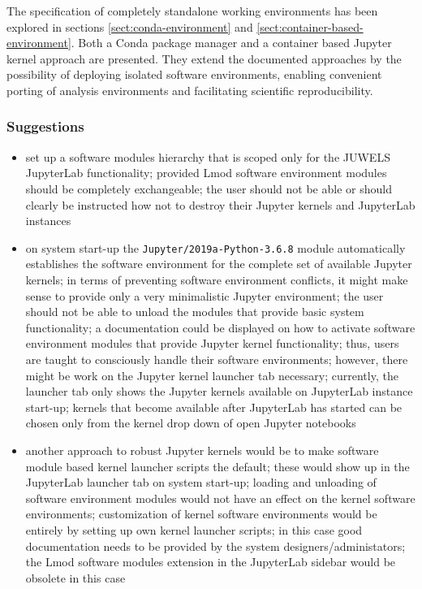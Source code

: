 The specification of completely standalone working environments has been explored in sections \ref{sect:conda-environment} and \ref{sect:container-based-environment}.
Both a Conda package manager and a container based Jupyter kernel approach are presented.
They extend the documented approaches by the possibility of deploying isolated software environments, enabling convenient porting of analysis environments and facilitating scientific reproducibility.

\subsubsection{Suggestions}

\begin{itemize}

  \item set up a software modules hierarchy that is scoped only for the JUWELS JupyterLab functionality;
  provided Lmod software environment modules should be completely exchangeable;
  the user should not be able or should clearly be instructed how not to destroy their Jupyter kernels and JupyterLab instances

  \item on system start-up the \verb|Jupyter/2019a-Python-3.6.8| module automatically establishes the software environment for the complete set of available Jupyter kernels;
  in terms of preventing software environment conflicts, it might make sense to provide only a very minimalistic Jupyter environment;
  the user should not be able to unload the modules that provide basic system functionality;
  a documentation could be displayed on how to activate software environment modules that provide Jupyter kernel functionality;
  thus, users are taught to consciously handle their software environments;
  however, there might be work on the Jupyter kernel launcher tab necessary;
  currently, the launcher tab only shows the Jupyter kernels available on JupyterLab instance start-up;
  kernels that become available after JupyterLab has started can be chosen only from the kernel drop down of open Jupyter notebooks

  \item another approach to robust Jupyter kernels would be to make software module based kernel launcher scripts the default; these would show up in the JupyterLab launcher tab on system start-up; loading and unloading of software environment modules would not have an effect on the kernel software environments; customization of kernel software environments would be entirely by setting up own kernel launcher scripts; in this case good documentation needs to be provided by the system designers/administators; the Lmod software modules extension in the JupyterLab sidebar would be obsolete in this case


\end{itemize}
